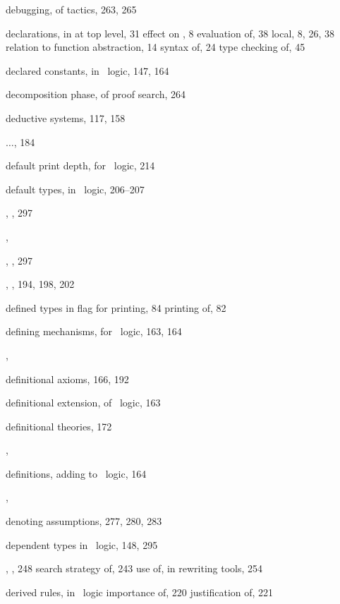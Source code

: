 \begin{theindex}
  \indexspace

  \item debugging, of tactics, 263, 265
  \item declarations, in \ML
    \subitem at top level, 31
    \subitem effect on , 8
    \subitem evaluation of, 38
    \subitem local, 8, 26, 38
    \subitem relation to function abstraction, 14
    \subitem syntax of, 24
    \subitem type checking of, 45
  \item declared constants, in \HOL\ logic, 147, 164
  \item decomposition phase, of proof search, 264
  \item deductive systems, 117, 158
  \item $\ldots$, 184
  \item default print depth, for \HOL\ logic, 214
  \item default types, in \HOL\ logic, 206--207
  \item {}, , 297
  \item {}, 
  \item {}, , 297
  \item {}, , 194, 198, 202
  \item defined types in \ML
    \subitem flag for printing, 84
    \subitem printing of, 82
  \item defining mechanisms, for \HOL\ logic, 163, 164
  \item {}, 
  \item definitional axioms, 166, 192
  \item definitional extension, of \HOL\ logic, 163
  \item definitional theories, 172
  \item {}, 
  \item definitions, adding to \HOL\ logic, 164
  \item {}, 
  \item denoting assumptions, 277, 280, 283
  \item dependent types in \HOL\ logic, 148, 295
  \item {}, , 248
    \subitem search strategy of, 243
    \subitem use of, in rewriting tools, 254
  \item derived rules, in \HOL\ logic
    \subitem importance of, 220
    \subitem justification of, 221

\end{theindex}
